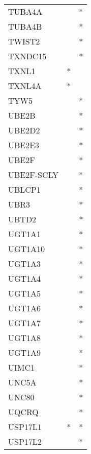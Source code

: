 \begin{longtable}{lcc}
TUBA4A          &                &          * \\
TUBA4B          &                &          * \\
TWIST2          &                &          * \\
TXNDC15         &                &          * \\
TXNL1           &              * &            \\
TXNL4A          &              * &            \\
TYW5            &                &          * \\
UBE2B           &                &          * \\
UBE2D2          &                &          * \\
UBE2E3          &                &          * \\
UBE2F           &                &          * \\
UBE2F-SCLY      &                &          * \\
UBLCP1          &                &          * \\
UBR3            &                &          * \\
UBTD2           &                &          * \\
UGT1A1          &                &          * \\
UGT1A10         &                &          * \\
UGT1A3          &                &          * \\
UGT1A4          &                &          * \\
UGT1A5          &                &          * \\
UGT1A6          &                &          * \\
UGT1A7          &                &          * \\
UGT1A8          &                &          * \\
UGT1A9          &                &          * \\
UIMC1           &                &          * \\
UNC5A           &                &          * \\
UNC80           &                &          * \\
UQCRQ           &                &          * \\
USP17L1         &              * &          * \\
USP17L2         &                &          * \\

\end{longtable}

